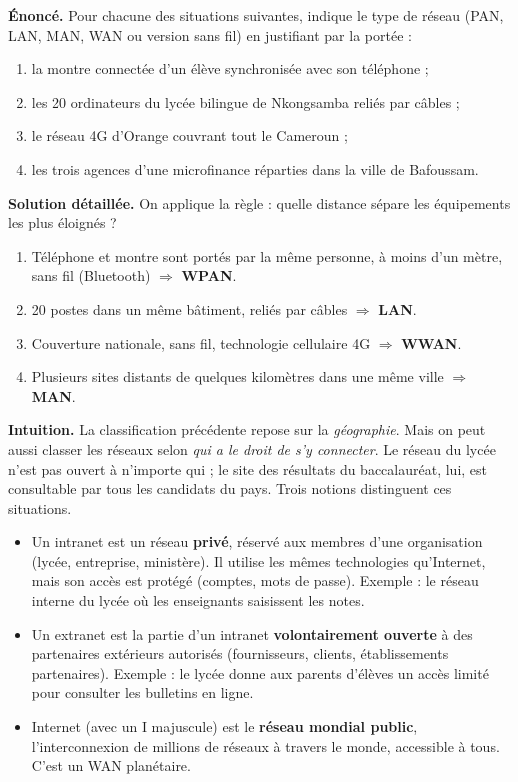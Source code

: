 \documentclass[11pt]{article}
\newcommand{\cle}[1]{{\popxbold\color{popdark}#1}}
\newcounter{popsec}
\newcounter{popsub}
\newcommand{\courssub}[1]{%
  \stepcounter{popsub}%
  \par\vspace{9pt}\noindent{\popxbold\fontsize{11.5}{13}\selectfont\color{popink}{\color{poporange}\thepopsec.\thepopsub}\hspace{6pt}#1}\par\nopagebreak\vspace{4pt}
}
\begin{document}
\begin{exoresolu}
\textbf{Énoncé.} Pour chacune des situations suivantes, indique le type de réseau (PAN, LAN, MAN, WAN ou version sans fil) en justifiant par la portée :
\begin{enumerate}
\item la montre connectée d'un élève synchronisée avec son téléphone ;
\item les 20 ordinateurs du lycée bilingue de Nkongsamba reliés par câbles ;
\item le réseau 4G d'Orange couvrant tout le Cameroun ;
\item les trois agences d'une microfinance réparties dans la ville de Bafoussam.
\end{enumerate}
\tcblower
\textbf{Solution détaillée.} On applique la règle : quelle distance sépare les équipements les plus éloignés ?
\begin{enumerate}
\item Téléphone et montre sont portés par la même personne, à moins d'un mètre, sans fil (Bluetooth) $\Rightarrow$ \textbf{WPAN}.
\item 20 postes dans un même bâtiment, reliés par câbles $\Rightarrow$ \textbf{LAN}.
\item Couverture nationale, sans fil, technologie cellulaire 4G $\Rightarrow$ \textbf{WWAN}.
\item Plusieurs sites distants de quelques kilomètres dans une même ville $\Rightarrow$ \textbf{MAN}.
\end{enumerate}
\end{exoresolu}

\courssub{Intranet, extranet et Internet}

\textbf{Intuition.} La classification précédente repose sur la \emph{géographie}. Mais on peut aussi classer les réseaux selon \emph{qui a le droit de s'y connecter}. Le réseau du lycée n'est pas ouvert à n'importe qui ; le site des résultats du baccalauréat, lui, est consultable par tous les candidats du pays. Trois notions distinguent ces situations.

\begin{definition}
\begin{itemize}
\item Un \cle{intranet} est un réseau \textbf{privé}, réservé aux membres d'une organisation (lycée, entreprise, ministère). Il utilise les mêmes technologies qu'Internet, mais son accès est protégé (comptes, mots de passe). Exemple : le réseau interne du lycée où les enseignants saisissent les notes.
\item Un \cle{extranet} est la partie d'un intranet \textbf{volontairement ouverte} à des partenaires extérieurs autorisés (fournisseurs, clients, établissements partenaires). Exemple : le lycée donne aux parents d'élèves un accès limité pour consulter les bulletins en ligne.
\item \cle{Internet} (avec un I majuscule) est le \textbf{réseau mondial public}, l'interconnexion de millions de réseaux à travers le monde, accessible à tous. C'est un WAN planétaire.
\end{itemize}
\end{definition}
\end{document}
